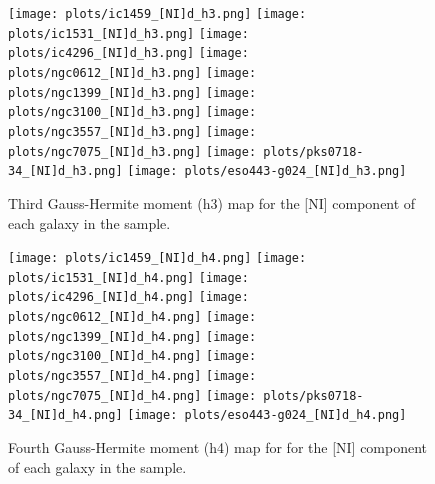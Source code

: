 \documentclass[fleqn,usenatbib,useAMS]{mnras}
\begin{document}
		\begin{figure*}
			\centering
			\texttt{[image: plots/ic1459\_[NI]d\_h3.png]}
			\texttt{[image: plots/ic1531\_[NI]d\_h3.png]}
			\texttt{[image: plots/ic4296\_[NI]d\_h3.png]}
			\texttt{[image: plots/ngc0612\_[NI]d\_h3.png]}
			\texttt{[image: plots/ngc1399\_[NI]d\_h3.png]}
			\texttt{[image: plots/ngc3100\_[NI]d\_h3.png]}
			\texttt{[image: plots/ngc3557\_[NI]d\_h3.png]}
			\texttt{[image: plots/ngc7075\_[NI]d\_h3.png]}
			\texttt{[image: plots/pks0718-34\_[NI]d\_h3.png]}
			\texttt{[image: plots/eso443-g024\_[NI]d\_h3.png]}
			\caption{Third Gauss-Hermite moment (h3) map for the [NI] component of each galaxy in the sample.}
			\label{fig:NI_h3}
		\end{figure*}

		\begin{figure*}
			\centering
			\texttt{[image: plots/ic1459\_[NI]d\_h4.png]}
			\texttt{[image: plots/ic1531\_[NI]d\_h4.png]}
			\texttt{[image: plots/ic4296\_[NI]d\_h4.png]}
			\texttt{[image: plots/ngc0612\_[NI]d\_h4.png]}
			\texttt{[image: plots/ngc1399\_[NI]d\_h4.png]}
			\texttt{[image: plots/ngc3100\_[NI]d\_h4.png]}
			\texttt{[image: plots/ngc3557\_[NI]d\_h4.png]}
			\texttt{[image: plots/ngc7075\_[NI]d\_h4.png]}
			\texttt{[image: plots/pks0718-34\_[NI]d\_h4.png]}
			\texttt{[image: plots/eso443-g024\_[NI]d\_h4.png]}
			\caption{Fourth Gauss-Hermite moment (h4) map for for the [NI] component of each galaxy in the sample.}
			\label{fig:NI_h4}
		\end{figure*}
\end{document}
